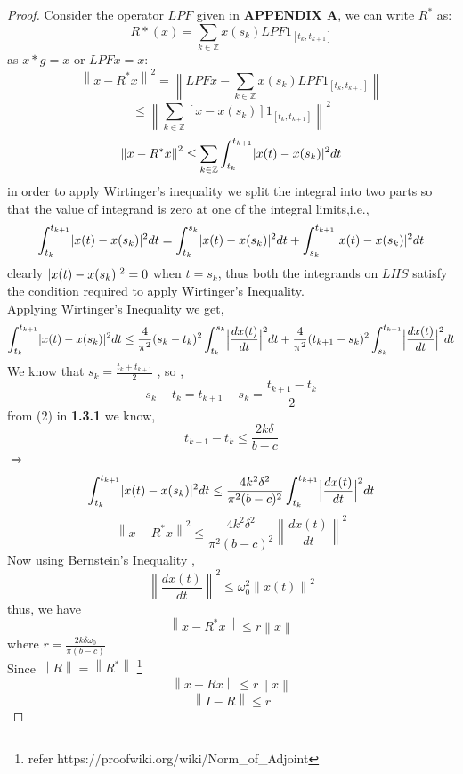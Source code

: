 \documentclass{article}
\DeclarePairedDelimiter\abs{\lvert}{\rvert}
\newcommand{\norm}[1]{\left\lVert#1\right\rVert}
\begin{document}
\begin{proof}
Consider the operator $LPF$ given in \textbf{APPENDIX A}, we can write $R^*$ as:
\begin{equation*}
    R*(x) = \sum_{k\in\mathbb{Z}}x(s_k)LPF1_{[t_k,t_{k+1}]}  
\end{equation*}
as $x*g = x$ or $LPFx = x$:
\[
    \norm{x-R^*x}^2 = \norm{LPFx - \sum_{k\in\mathbb{Z}}x(s_k)LPF1_{[t_k,t_{k+1}]}}
\]
\[
    \leq \norm{\sum_{k\in\mathbb{Z}}[x-x(s_k)]1_{[t_k,t_{k+1}]}}^2
\]
\[
    \norm{x-R^*x}^2 \leq \sum_{k\in\mathbb{Z}}\int_{t_k}^{t_{k+1}}\abs{x(t)-x(s_k)}^2dt
\]
in order to apply Wirtinger's inequality we split the integral into two parts so that the value of integrand is zero at one of the integral limits,i.e.,
\[
    \int_{t_k}^{t_{k+1}}\abs{x(t)-x(s_k)}^2dt = \int_{t_k}^{s_{k}}\abs{x(t)-x(s_k)}^2dt + \int_{s_k}^{t_{k+1}}\abs{x(t)-x(s_k)}^2dt
\]
clearly $\abs{x(t)-x(s_k)}^2 = 0$ when $t = s_k$, thus both the integrands on $LHS$ satisfy the condition required to apply Wirtinger's Inequality.\\
Applying Wirtinger's Inequality we get,
\[
    \int_{t_k}^{t_{k+1}}\abs{x(t)-x(s_k)}^2dt \leq \frac{4}{\pi^2}(s_k - t_k)^2\int_{t_k}^{s_k}\abs[\Big]{\frac{dx(t)}{dt}}^2dt + \frac{4}{\pi^2}(t_{k+1} - s_k)^2\int_{s_k}^{t_{k+1}}\abs[\Big]{\frac{dx(t)}{dt}}^2dt
\]
We know that $s_k = \frac{t_k+t_{k+1}}{2}$ , so ,
\begin{equation*}
    s_k - t_k = t_{k+1} - s_k = \frac{t_{k+1} - t_k}{2}
\end{equation*}
from (2) in \textbf{1.3.1} we know,
\begin{equation*}
    t_{k+1} - t_k \leq \frac{2k\delta}{b-c}
\end{equation*}
$\Rightarrow$
\[
      \int_{t_k}^{t_{k+1}}\abs{x(t)-x(s_k)}^2dt \leq \frac{4k^2{\delta}^2}{\pi^2(b-c)^2}\int_{t_k}^{t_{k+1}}\abs[\Big]{\frac{dx(t)}{dt}}^2dt  
\]
\[
    \norm{x-R^*x}^2 \leq \frac{4k^2{\delta}^2}{\pi^2(b-c)^2}\norm{\frac{dx(t)}{dt}}^2
\]
Now using Bernstein's Inequality , 
\[
    \norm{\frac{dx(t)}{dt}}^2 \leq \omega_0^2\norm{x(t)}^2
\]
thus, we have
\[
    \norm{x-R^*x} \leq r\norm{x}
\]
where $r = \frac{2k\delta\omega_0}{\pi(b-c)} $\\
Since $\norm{R} = \norm{R^*}$ \footnote{refer {https://proofwiki.org/wiki/Norm\_of\_Adjoint}}
\[
    \norm{x-Rx} \leq r\norm{x}
\]
\[
    \norm{I-R} \leq r
\]
\end{proof}
\end{document}
